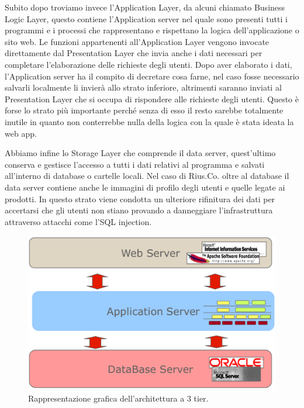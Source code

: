 Subito dopo troviamo invece l'Application Layer, da alcuni chiamato Business Logic Layer, questo contiene l'Application server nel quale sono presenti tutti i programmi e i processi che rappresentano e rispettano la logica dell'applicazione o sito web. Le funzioni appartenenti all'Application Layer vengono invocate direttamente dal Presentation Layer che invia anche i dati necessari per completare l'elaborazione delle richieste degli utenti. Dopo aver elaborato i dati, l'Application server ha il compito di decretare cosa farne, nel caso fosse necessario salvarli localmente li invierà allo strato inferiore, altrimenti saranno inviati al Presentation Layer che si occupa di rispondere alle richieste degli utenti. Questo è forse lo strato più importante perché senza di esso il resto sarebbe totalmente inutile in quanto non conterrebbe nulla della logica con la quale è stata ideata la web app. 
\medskip

Abbiamo infine lo Storage Layer che comprende il data server, quest'ultimo conserva e gestisce l'accesso a tutti i dati relativi al programma e salvati all'interno di database o cartelle locali. Nel caso di Rius.Co. oltre al database il data server contiene anche le immagini di profilo degli utenti e quelle legate ai prodotti. In questo strato viene condotta un ulteriore rifinitura dei dati per accertarsi che gli utenti non stiano provando a danneggiare l'infrastruttura attraverso attacchi come l'SQL injection. 

\begin{figure}[ht]
    \centering\includegraphics[scale=0.24]{images/3tier.png}
    \caption{Rappresentazione grafica dell'architettura a 3 tier.}
\end{figure}

